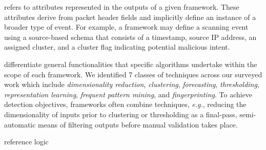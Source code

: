\documentclass[manuscript,nonacm]{acmart}
\begin{document}
 refers to attributes represented in the outputs of a given framework.
These attributes derive from packet header fields and implicitly define an instance of a broader type of event.
For example, a framework may define a scanning event using a source-based schema that consists of a timestamp, source IP address, an assigned cluster, and a cluster flag indicating potential malicious intent.

 differentiate general functionalities that specific algorithms undertake within the scope of each framework.
We identified 7 classes of techniques across our surveyed work which include \textit{dimensionality reduction}, \textit{clustering}, \textit{forecasting}, \textit{thresholding}, \textit{representation learning},
\textit{frequent pattern mining}, and \textit{fingerprinting}. 
To achieve detection objectives, frameworks often combine techniques, \textit{e.g.}, reducing the dimensionality of inputs prior to clustering or 
thresholding as a final-pass, semi-automatic means of filtering outputs before manual validation takes place.


 reference logic 

\end{document}
